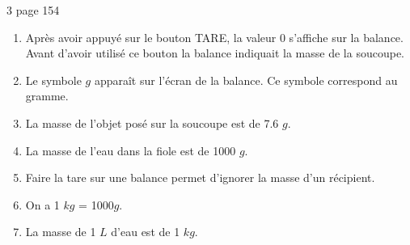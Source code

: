 \begin{myact}{3 page 154}
	\begin{enumerate}
		\item Après avoir appuyé sur le bouton TARE, la valeur 0 s'affiche sur la balance. Avant d'avoir utilisé ce bouton la balance indiquait la masse de la soucoupe. \pause
		\item Le symbole $g$ apparaît sur l'écran de la balance. Ce symbole correspond au gramme.\pause
		\item La masse de l'objet posé sur la soucoupe est de \num{7.6} $g$.\pause
		\item La masse de l'eau dans la fiole est de \num{1000} $g$.\pause
		\item Faire la tare sur une balance permet d'ignorer la masse d'un récipient.\pause
		\item On a 1 $kg$ = \num{1000}$g$.\pause
		\item La masse de  1 $L$ d'eau est de 1 $kg$.
	\end{enumerate}
\end{myact}